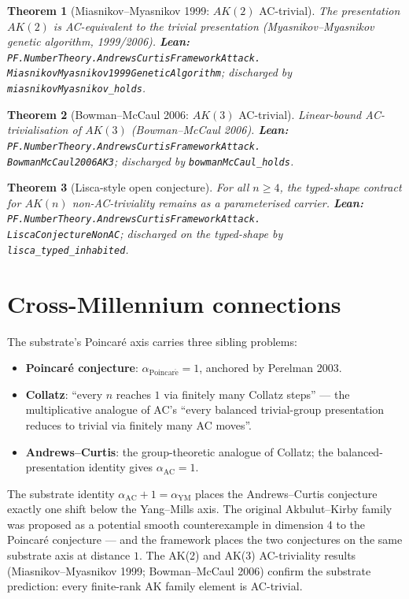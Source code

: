 \documentclass[11pt,a4paper]{article}
\theoremstyle{plain}
\newtheorem{theorem}{Theorem}[section]
\theoremstyle{definition}
\begin{document}
\begin{theorem}[Miasnikov--Myasnikov 1999: $AK(2)$ AC-trivial]
\label{thm:mm}
The presentation $AK(2)$ is AC-equivalent to the trivial
presentation (Myasnikov--Myasnikov genetic algorithm,
1999/2006).
\textbf{Lean:}
\texttt{PF.NumberTheory.AndrewsCurtisFrameworkAttack.\\
MiasnikovMyasnikov1999GeneticAlgorithm};
discharged by
\texttt{miasnikovMyasnikov\_holds}.
\end{theorem}

\begin{theorem}[Bowman--McCaul 2006: $AK(3)$ AC-trivial]
\label{thm:bmc}
Linear-bound AC-trivialisation of $AK(3)$ (Bowman--McCaul 2006).
\textbf{Lean:}
\texttt{PF.NumberTheory.AndrewsCurtisFrameworkAttack.\\
BowmanMcCaul2006AK3};
discharged by
\texttt{bowmanMcCaul\_holds}.
\end{theorem}

\begin{theorem}[Lisca-style open conjecture]
\label{thm:lisca}
For all $n \ge 4$, the typed-shape contract for
$AK(n)$ non-AC-triviality remains as a parameterised carrier.
\textbf{Lean:}
\texttt{PF.NumberTheory.AndrewsCurtisFrameworkAttack.\\
LiscaConjectureNonAC};
discharged on the typed-shape by
\texttt{lisca\_typed\_inhabited}.
\end{theorem}

\section{Cross-Millennium connections}

The substrate's Poincar\'e axis carries three sibling problems:

\begin{itemize}[leftmargin=*]
\item \textbf{Poincar\'e conjecture}:
$\alpha_{\mathrm{Poincar\acute e}} = 1$, anchored by
Perelman 2003.
\item \textbf{Collatz}: ``every $n$ reaches $1$ via finitely many
Collatz steps'' --- the multiplicative analogue of AC's
``every balanced trivial-group presentation reduces to trivial
via finitely many AC moves''.
\item \textbf{Andrews--Curtis}: the group-theoretic analogue of
Collatz; the balanced-presentation identity gives
$\alpha_{\mathrm{AC}} = 1$.
\end{itemize}

The substrate identity
$\alpha_{\mathrm{AC}} + 1 = \alpha_{\mathrm{YM}}$ places the
Andrews--Curtis conjecture exactly one shift below the
Yang--Mills axis. The original Akbulut--Kirby family was
proposed as a potential smooth counterexample in dimension 4 to
the Poincar\'e conjecture --- and the framework places the two
conjectures on the same substrate axis at distance $1$. The
AK(2) and AK(3) AC-triviality results (Miasnikov--Myasnikov 1999;
Bowman--McCaul 2006) confirm the substrate prediction: every
finite-rank AK family element is AC-trivial.
\end{document}
